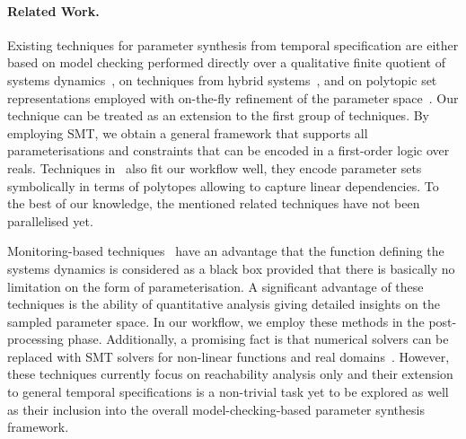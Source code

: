 \documentclass{llncs}
\begin{document}
\paragraph{Related Work.}
Existing techniques for parameter synthesis from temporal specification are either based on model checking performed directly over a qualitative finite quotient of systems dynamics~\cite{BYW+07,YB08,TCBB,CMSB15}, on techniques from hybrid systems~\cite{Bogomolov15}, and on polytopic set representations employed with on-the-fly refinement of the parameter space~\cite{Dang2015}. Our technique can be treated as an extension to the first group of techniques. By employing SMT, we obtain a general framework that supports all parameterisations and constraints that can be encoded in a first-order logic over reals. Techniques in~\cite{BYW+07,GrosuBFGGSB11} also fit our workflow well, they encode parameter sets symbolically in terms of polytopes allowing to capture linear dependencies. To the best of our knowledge, the mentioned related techniques have not been parallelised yet.

Monitoring-based techniques~\cite{RBF+09,DonzeBreach} have an advantage that the function defining the systems dynamics is considered as a black box provided that there is basically no limitation on the form of parameterisation. A significant advantage of these techniques is the ability of quantitative analysis giving detailed insights on the sampled parameter space. In our workflow, we employ these methods in the post-processing phase. 
Additionally, a promising fact is that numerical solvers can be replaced with SMT solvers for non-linear functions and real domains~\cite{GaoKC13,BioPsy}. However, these techniques currently focus on reachability analysis only and their extension to general temporal specifications is a non-trivial task yet to be explored as well as their inclusion into the overall model-checking-based parameter synthesis framework. 

\end{document}
